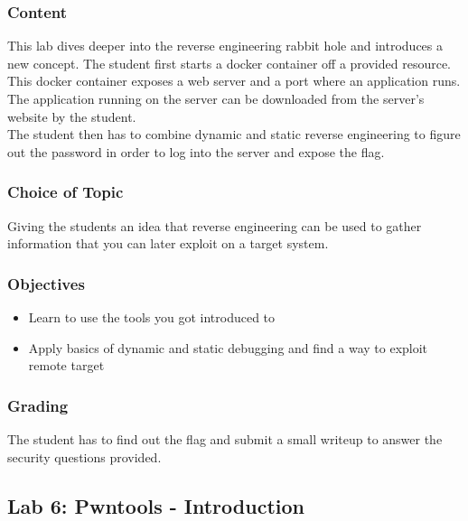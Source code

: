 \subsubsection*{Content}
This lab dives deeper into the reverse engineering rabbit hole and introduces a new concept. The student first starts a docker container off a provided resource.
This docker container exposes a web server and a port where an application runs. The application running on the server can be downloaded from the server's website by the student. \\
The student then has to combine dynamic and static reverse engineering to figure out the password in order to log into the server and expose the flag.
\subsubsection*{Choice of Topic}
Giving the students an idea that reverse engineering can be used to gather information that you can later exploit on a target system.
\subsubsection*{Objectives}
\begin{itemize}
    \item Learn to use the tools you got introduced to
    \item Apply basics of dynamic and static debugging and find a way to exploit remote target 
\end{itemize}
\subsubsection*{Grading}
The student has to find out the flag and submit a small writeup to answer the security questions provided.
\pagebreak

\subsection{Lab 6: Pwntools - Introduction}
